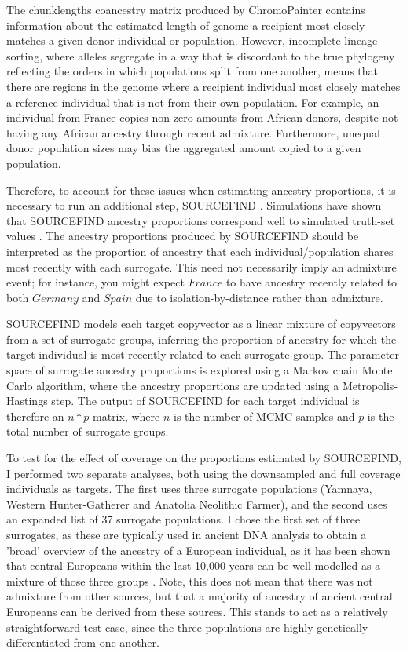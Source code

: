 {The chunklengths coancestry matrix produced by ChromoPainter contains information about the estimated length of genome a recipient most closely matches a given donor individual or population. However, incomplete lineage sorting, where alleles segregate in a way that is discordant to the true phylogeny reflecting the orders in which populations split from one another, means that there are regions in the genome where a recipient individual most closely matches a reference individual that is not from their own population. For example, an individual from France copies non-zero amounts from African donors, despite not having any African ancestry through recent admixture. Furthermore, unequal donor population sizes may bias the aggregated amount copied to a given population. 

Therefore, to account for these issues when estimating ancestry proportions, it is necessary to run an additional step, SOURCEFIND \cite{Chacon-Duque2018}. Simulations have shown that SOURCEFIND ancestry proportions correspond well to simulated truth-set values \cite{Chacon-Duque2018}. The ancestry proportions produced by SOURCEFIND should be interpreted as the proportion of ancestry that each individual/population shares most recently with each surrogate. This need not necessarily imply an admixture event; for instance, you might expect $France$ to have ancestry recently related to both $Germany$ and $Spain$ due to isolation-by-distance rather than admixture. 

SOURCEFIND models each target copyvector as a linear mixture of copyvectors from a set of surrogate groups, inferring the proportion of ancestry for which the target individual is most recently related to each surrogate group. The parameter space of surrogate ancestry proportions is explored using a Markov chain Monte Carlo algorithm, where the ancestry proportions are updated using a Metropolis-Hastings step. The output of SOURCEFIND for each target individual is therefore an $n*p$ matrix, where $n$ is the number of MCMC samples and $p$ is the total number of surrogate groups. 

To test for the effect of coverage on the proportions estimated by SOURCEFIND, I performed two separate analyses, both using the downsampled and full coverage individuals as targets. The first uses three surrogate populations (Yamnaya, Western Hunter-Gatherer and Anatolia Neolithic Farmer), and the second uses an expanded list of 37 surrogate populations. I chose the first set of three surrogates, as these are typically used in ancient DNA analysis to obtain a 'broad' overview of the ancestry of a European individual, as it has been shown that central Europeans within the last 10,000 years can be well modelled as a mixture of those three groups \cite{Lazaridis2014, Haak2015}. Note, this does not mean that there was not admixture from other sources, but that a majority of ancestry of ancient central Europeans can be derived from these sources. This stands to act as a relatively straightforward test case, since the three populations are highly genetically differentiated from one another.

}
